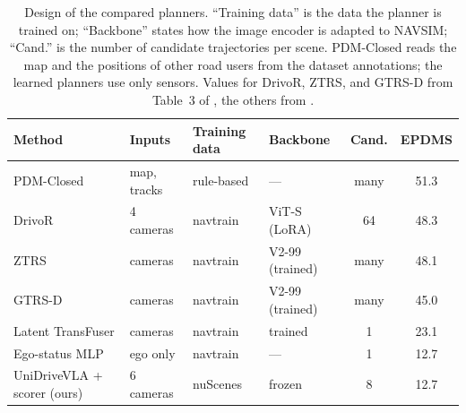\documentclass[11pt, a4paper, oneside]{book}
\begin{document}
\begin{table}[ht]
\centering
\caption[Design of the compared planners]{Design of the compared planners. ``Training data'' is
the data the planner is trained on; ``Backbone'' states how the image encoder is adapted to
NAVSIM; ``Cand.'' is the number of candidate trajectories per scene. PDM-Closed reads the map
and the positions of other road users from the dataset annotations; the learned planners use
only sensors. Values for DrivoR, ZTRS, and GTRS-D from Table~3 of \cite{drivor}, the
others from \cite{pseudosim,navsim}.}
\label{tab:design}
\small
\setlength{\tabcolsep}{4pt}
\begin{tabular}{@{}>{\raggedright\arraybackslash}p{3.6cm} p{1.9cm} p{1.9cm} l c c@{}}
\toprule
Method & Inputs & Training data & Backbone & Cand. & EPDMS \\
\midrule
PDM-Closed \cite{pdm} & map, tracks & rule-based & --- & many & 51.3 \\
DrivoR \cite{drivor} & 4 cameras & navtrain & ViT-S (LoRA) & 64 & 48.3 \\
ZTRS \cite{ztrs} & cameras & navtrain & V2-99 (trained) & many & 48.1 \\
GTRS-D \cite{gtrs} & cameras & navtrain & V2-99 (trained) & many & 45.0 \\
Latent TransFuser \cite{transfuser,pseudosim} & cameras & navtrain & trained & 1 & 23.1 \\
Ego-status MLP \cite{pseudosim} & ego only & navtrain & --- & 1 & 12.7 \\
\midrule
UniDriveVLA + scorer (ours) & 6 cameras & nuScenes & frozen & 8 & 12.7 \\
\bottomrule
\end{tabular}
\end{table}
\end{document}
